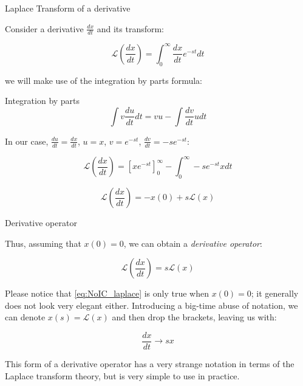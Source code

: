 \documentclass{beamer}
\begin{document}
\begin{frame}{Laplace Transform of a derivative}
\begin{flushleft}

Consider a derivative $\frac{dx}{dt}$ and its transform:

\begin{equation}
    \mathcal{L}\left(\frac{dx}{dt}\right) = \int_0^\infty \frac{dx}{dt} e^{-st}dt
\end{equation}

we will make use of the integration by parts formula:

\begin{block}{Integration by parts}
\begin{equation}
\int v \frac{du}{dt} dt = vu - 
\int \frac{dv}{dt} u dt    
\end{equation}
\end{block}

In our case, $\frac{du}{dt} = \frac{dx}{dt}$, $u = x$, $v = e^{-st}$, $\frac{dv}{dt} = -se^{-st}$:

\begin{equation}
\mathcal{L}\left(\frac{dx}{dt}\right) = \left[x e^{-st} \right]_0^\infty - 
\int_0^\infty -se^{-st} x dt  
\end{equation}

\begin{equation}
\mathcal{L}\left(\frac{dx}{dt}\right) = -x(0) + s\mathcal{L}(x)  
\end{equation}

\end{flushleft}
\end{frame}




\begin{frame}{Derivative operator}
\begin{flushleft}

Thus, assuming that $x(0) = 0$, we can obtain a \emph{derivative operator}:

\begin{equation}
\label{eq:NoIC_laplace}
\mathcal{L}\left(\frac{dx}{dt}\right) = s \mathcal{L}\left(x\right)
\end{equation}

\bigskip

Please notice that \eqref{eq:NoIC_laplace} is only true when $x(0) = 0$; it generally does not look very elegant either. Introducing a big-time abuse of notation, we can denote $x(s) = \mathcal{L}\left(x\right)$ and then drop the brackets, leaving us with:

\begin{equation}
\frac{dx}{dt} \longrightarrow s x
\end{equation}

This form of a derivative operator has a very strange notation in terms of the Laplace transform theory, but is very simple to use in practice.

\end{flushleft}
\end{frame}
\end{document}
